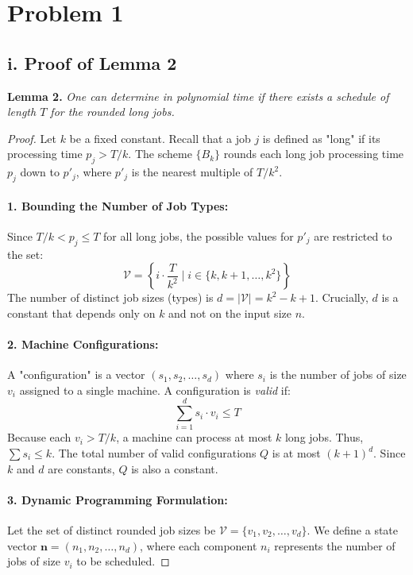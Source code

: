 \section*{Problem 1}
\subsection*{i. Proof of Lemma 2}

\noindent \textbf{Lemma 2.} \textit{One can determine in polynomial time if there exists a schedule of length $T$ for the rounded long jobs.}

\begin{proof}
Let $k$ be a fixed constant. Recall that a job $j$ is defined as "long" if its processing time $p_j > T/k$. The scheme $\{B_k\}$ rounds each long job processing time $p_j$ down to $p'_j$, where $p'_j$ is the nearest multiple of $T/k^2$.

\paragraph{1. Bounding the Number of Job Types:}
Since $T/k < p_j \le T$ for all long jobs, the possible values for $p'_j$ are restricted to the set:
\[ \mathcal{V} = \left\{ i \cdot \frac{T}{k^2} \mid i \in \{k, k+1, \dots, k^2\} \right\} \]
The number of distinct job sizes (types) is $d = |\mathcal{V}| = k^2 - k + 1$. Crucially, $d$ is a constant that depends only on $k$ and not on the input size $n$.

\paragraph{2. Machine Configurations:}
A "configuration" is a vector $(s_1, s_2, \dots, s_d)$ where $s_i$ is the number of jobs of size $v_i$ assigned to a single machine. A configuration is \textit{valid} if:
\[ \sum_{i=1}^d s_i \cdot v_i \le T \]
Because each $v_i > T/k$, a machine can process at most $k$ long jobs. Thus, $\sum s_i \le k$. The total number of valid configurations $Q$ is at most $(k+1)^d$. Since $k$ and $d$ are constants, $Q$ is also a constant.

\paragraph{3. Dynamic Programming Formulation:}
Let the set of distinct rounded job sizes be $\mathcal{V} = \{v_1, v_2, \dots, v_d\}$. We define a state vector $\mathbf{n} = (n_1, n_2, \dots, n_d)$, where each component $n_i$ represents the number of jobs of size $v_i$ to be scheduled. 


\end{proof}
